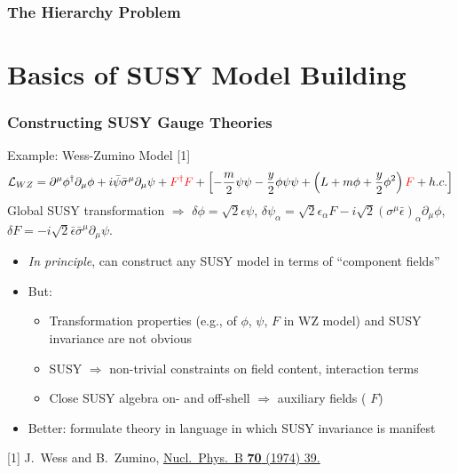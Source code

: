 \documentclass[10pt,aspectratio=169]{beamer}
\begin{document}
\begin{frame}
  \frametitle{The Hierarchy Problem}
\end{frame}

\section{Basics of SUSY Model Building}

\begin{frame}
  \frametitle{Constructing SUSY Gauge Theories}
  \begin{block}{Example: Wess-Zumino Model [1]}
    \begin{equation*}
      \mathcal{L}_{WZ} = \partial^\mu \phi^\dagger \partial_\mu \phi
      + i \bar{\psi} \bar{\sigma}^\mu \partial_\mu \psi + {\color{red}
        F^\dagger F} + \left [ -\frac{m}{2} \psi \psi - \frac{y}{2} \phi \psi
        \psi + \left ( L + m \phi + \frac{y}{2} \phi^2 \right ) {\color{red} F}
        + h.c. \right ]
    \end{equation*}
    Global SUSY transformation $\Rightarrow$
    $\delta \phi = \sqrt{2} \epsilon \psi$,
    $\delta \psi_\alpha = \sqrt{2} \epsilon_\alpha F - i \sqrt{2}
    ( \sigma^\mu \bar{\epsilon})_\alpha \partial_\mu \phi$,
    $\delta F = -i \sqrt{2} \bar{\epsilon} \bar{\sigma}^\mu \partial_\mu \psi$.
  \end{block}
  \begin{itemize}\itemsep1em
  \item \emph{In principle}, can construct any SUSY model in terms of
    ``component fields''
  \item But:
    \begin{itemize}\itemsep0.5em
    \item Transformation properties (e.g., of $\phi$, $\psi$, $F$ in WZ model)
      and SUSY invariance \alert{are not obvious}
    \item SUSY $\Rightarrow$ \alert{non-trivial constraints on field
      content, interaction terms}
    \item Close SUSY algebra on- and off-shell $\Rightarrow$ \alert{auxiliary
      fields} ({\color{red} $F$})
    \end{itemize}
  \item {\color{blue} Better: formulate theory in language in which
    SUSY invariance is manifest}
  \end{itemize}
  \vfill
      { \tiny [1] J.~Wess and B.~Zumino,
        \href{http://dx.doi.org/10.1016/0550-3213(74)90355-1}{%
          Nucl.~Phys.~B \textbf{70} (1974) 39.}}
\end{frame}
\end{document}
